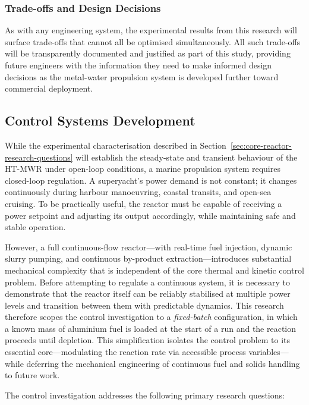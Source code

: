\documentclass[12pt]{article}
\begin{document}
\subsubsection*{Trade-offs and Design Decisions}

As with any engineering system, the experimental results from this research will 
surface trade-offs that cannot all be optimised simultaneously. All such trade-offs 
will be transparently documented and justified as part of this study, providing 
future engineers with the information they need to make informed design decisions 
as the metal-water propulsion system is developed further toward commercial 
deployment.

\break

\subsection{Control Systems Development}
\label{sec:control-questions}

While the experimental characterisation described in Section~\ref{sec:core-reactor-research-questions} will establish the steady-state and transient behaviour of the HT-MWR under open-loop conditions, a marine propulsion system requires closed-loop regulation. A superyacht's power demand is not constant; it changes continuously during harbour manoeuvring, coastal transits, and open-sea cruising. To be practically useful, the reactor must be capable of receiving a power setpoint and adjusting its output accordingly, while maintaining safe and stable operation.

However, a full continuous-flow reactor---with real-time fuel injection, dynamic slurry pumping, and continuous by-product extraction---introduces substantial mechanical complexity that is independent of the core thermal and kinetic control problem. Before attempting to regulate a continuous system, it is necessary to demonstrate that the reactor itself can be reliably stabilised at multiple power levels and transition between them with predictable dynamics. This research therefore scopes the control investigation to a \emph{fixed-batch} configuration, in which a known mass of aluminium fuel is loaded at the start of a run and the reaction proceeds until depletion. This simplification isolates the control problem to its essential core---modulating the reaction rate via accessible process variables---while deferring the mechanical engineering of continuous fuel and solids handling to future work.

The control investigation addresses the following primary research questions:
\end{document}
